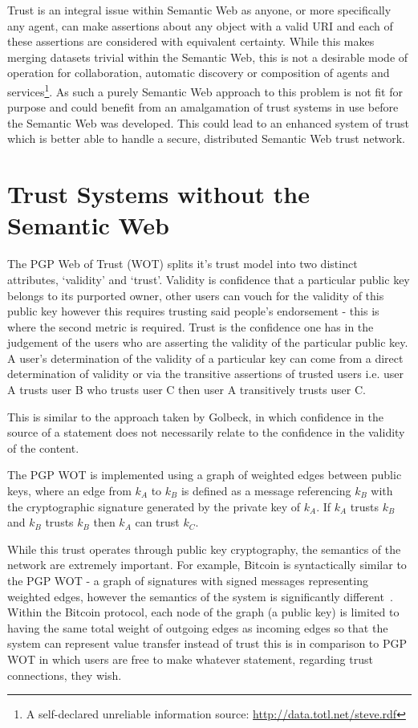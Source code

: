 \documentclass{acm_proc_article-sp}
\begin{document}
Trust is an integral issue within Semantic Web as anyone, or more specifically any agent, can make assertions about any object with a valid URI and each of these assertions are considered with equivalent certainty.  While this makes merging datasets trivial within the Semantic Web\cite{golbeck_trust_2003}, this is not a desirable mode of operation for collaboration, automatic discovery or composition of agents and services\footnote{A self-declared unreliable information source: \url{http://data.totl.net/steve.rdf}}. As such a purely Semantic Web approach to this problem is not fit for purpose and could benefit from an amalgamation of trust systems in use before the Semantic Web was developed.  This could lead to an enhanced system of trust which is better able to handle a secure, distributed Semantic Web trust network.

\section{Trust Systems without the Semantic Web}
The PGP Web of Trust (WOT)\cite{_how_1999} splits it's trust model into two distinct attributes, `validity' and `trust'.   Validity is confidence that a particular public key belongs to its purported owner, other users can vouch for the validity of this public key however this requires trusting said people's endorsement - this is where the second metric is required.  Trust is the confidence one has in the judgement of the users who are asserting the validity of the particular public key.  A user's determination of the validity of a particular key can come from a direct determination of validity or via the transitive assertions of trusted users i.e. user A trusts user B who trusts user C then user A transitively trusts user C.

This is similar to the approach taken by Golbeck, in which confidence in the source of a statement does not necessarily relate to the confidence in the validity of the content.

The PGP WOT is implemented using a graph of weighted edges between public keys, where an edge from $k_A$ to $k_B$ is defined as a message referencing $k_B$ with the cryptographic signature generated by the private key of $k_A$. If $k_A$ trusts $k_B$ and $k_B$ trusts $k_B$ then $k_A$ can trust $k_C$.

While this trust operates through public key cryptography, the semantics of the network are extremely important. For example, Bitcoin is syntactically similar to the PGP WOT - a graph of signatures with signed messages representing weighted edges, however the semantics of the system is significantly different~\cite{nakamoto_bitcoin:_2008}. Within the Bitcoin protocol, each node of the graph (a public key) is limited to having the same total weight of outgoing edges as incoming edges so that the system can represent value transfer instead of trust this is in comparison to PGP WOT in which users are free to make whatever statement, regarding trust connections, they wish.
\end{document}
